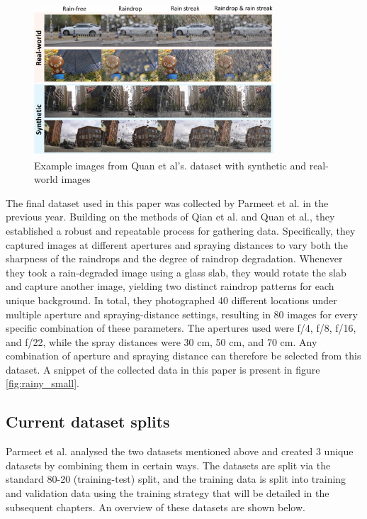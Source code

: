 \documentclass[11pt]{ociamthesis}  %
\begin{document}
\begin{figure}[ht]
    \centering
    \includegraphics[width=0.8\textwidth, height=0.4\textheight, keepaspectratio]{figures/Quan(RainDS) dataset examples.png}
    \caption{Example images from Quan et al's. dataset with synthetic and real-world images}
    \label{fig:quan_example}
\end{figure}

The final dataset used in this paper was collected by Parmeet et al.\cite{Parmeet_Report} in the previous year. Building on the methods of Qian et al. and Quan et al., they established a robust and repeatable process for gathering data. Specifically, they captured images at different apertures and spraying distances to vary both the sharpness of the raindrops and the degree of raindrop degradation. Whenever they took a rain-degraded image using a glass slab, they would rotate the slab and capture another image, yielding two distinct raindrop patterns for each unique background. In total, they photographed 40 different locations under multiple aperture and spraying-distance settings, resulting in 80 images for every specific combination of these parameters. The apertures used were f/4, f/8, f/16, and f/22, while the spray distances were 30 cm, 50 cm, and 70 cm. Any combination of aperture and spraying distance can therefore be selected from this dataset. A snippet of the collected data in this paper is present in figure \ref{fig:rainy_small}.

\subsection{Current dataset splits}
Parmeet et al.\cite{Parmeet_Report} analysed the two datasets mentioned above and created  3 unique datasets by combining them in certain ways. The datasets are split via the standard 80-20 (training-test) split, and the training data is split into training and validation data using the training strategy that will be detailed in the subsequent chapters. An overview of these datasets are shown below.
\end{document}
